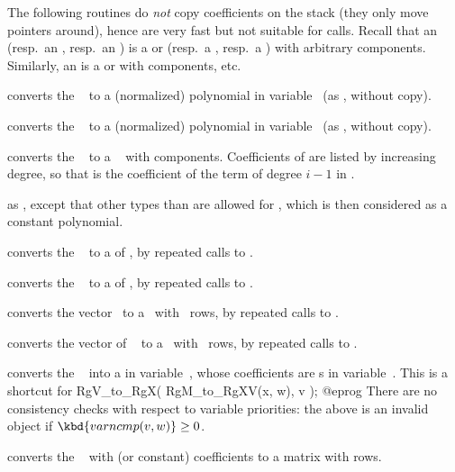 The following routines do \emph{not} copy coefficients on the stack (they
only move pointers around), hence are very fast but not suitable for
 calls. Recall that an  (resp.~an , resp.~an
) is a  or  (resp.~a , resp.~a )
with arbitrary components. Similarly, an  is a  or
 with  components, etc.

 converts the ~ to a
(normalized) polynomial in variable~ (as , without
copy).

 converts the ~
to a (normalized) polynomial in variable~ (as ,
without copy).

 converts the ~ to a
~ with  components. Coefficients of  are listed
by increasing degree, so that  is the coefficient of the term of
degree $i-1$ in .

 as , except that other
types than  are allowed for , which is then considered as a
constant polynomial.

 converts the ~ to a
 of , by repeated calls to .

 converts the ~
to a  of , by repeated calls to .

 converts the vector~ to
a~ with ~rows, by repeated calls to .

 converts the vector of ~
to a~ with ~rows, by repeated calls to .

 converts the ~ into
a  in variable~, whose coefficients are s in
variable~. This is a shortcut for
\bprog
  RgV_to_RgX( RgM_to_RgXV(x, w), v );
@eprog\noindent
There are no consistency checks with respect to variable
priorities: the above is an invalid object if $\kbd{varncmp(v, w)} \geq 0$.

 converts the ~ with
 (or constant) coefficients to a matrix with  rows.

